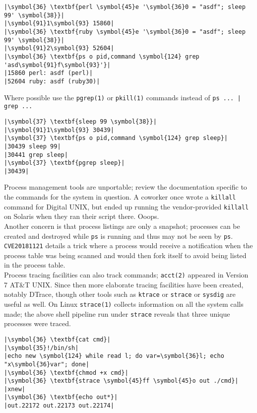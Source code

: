 \documentclass[10pt,a4paper]{article}
\begin{document}
\begin{lstlisting}
|\symbol{36} \textbf{perl \symbol{45}e '\symbol{36}0 = "asdf"; sleep 99' \symbol{38}}|
|\symbol{91}1\symbol{93} 15860|
|\symbol{36} \textbf{ruby \symbol{45}e '\symbol{36}0 = "asdf"; sleep 99' \symbol{38}}|
|\symbol{91}2\symbol{93} 52604|
|\symbol{36} \textbf{ps o pid,command \symbol{124} grep 'asd\symbol{91}f\symbol{93}'}|
|15860 perl: asdf (perl)|
|52604 ruby: asdf (ruby30)|
\end{lstlisting}

Where possible use the \texttt{pgrep(1)} or \texttt{pkill(1)} commands
instead of \texttt{ps ... | grep ...}

\begin{lstlisting}
|\symbol{37} \textbf{sleep 99 \symbol{38}}|
|\symbol{91}1\symbol{93} 30439|
|\symbol{37} \textbf{ps o pid,command \symbol{124} grep sleep}|
|30439 sleep 99|
|30441 grep sleep|
|\symbol{37} \textbf{pgrep sleep}|
|30439|
\end{lstlisting}

Process management tools are unportable; review the documentation
specific to the commands for the system in question. A coworker once
wrote a \texttt{killall} command for Digital UNIX, but ended up running
the vendor-provided \texttt{killall} on Solaris when they ran their
script there. Ooops. \\

Another concern is that process listings are only a snapshot; processes
can be created and destroyed while \texttt{ps} is running and thus may
not be seen by \texttt{ps}. \texttt{CVE20181121}
details a trick where a process would receive a notification when the
process table was being scanned and would then fork itself to avoid
being listed in the process table. \\

Process tracing facilities can also track commands; \texttt{acct(2)}
appeared in Version 7 AT\&T UNIX. Since then more elaborate tracing
facilities have been created, notably DTrace, though other tools such as
\texttt{ktrace} or \texttt{strace} or \texttt{sysdig} are useful as
well. On Linux \texttt{strace(1)} collects information on all the system
calls made; the above shell pipeline run under \texttt{strace} reveals
that three unique processes were traced.

\begin{lstlisting}
|\symbol{36} \textbf{cat cmd}|
|\symbol{35}!/bin/sh|
|echo new \symbol{124} while read l; do var=\symbol{36}l; echo "x\symbol{36}var"; done|
|\symbol{36} \textbf{chmod +x cmd}|
|\symbol{36} \textbf{strace \symbol{45}ff \symbol{45}o out ./cmd}|
|xnew|
|\symbol{36} \textbf{echo out*}|
|out.22172 out.22173 out.22174|
\end{lstlisting}
\end{document}
